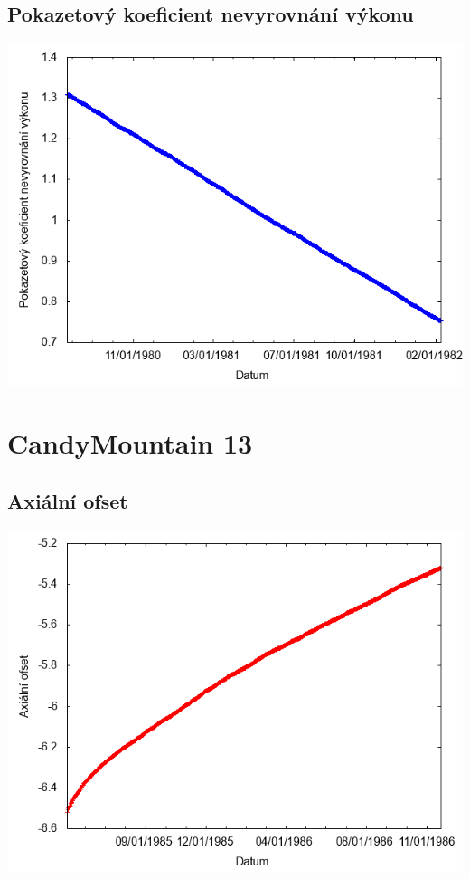 \documentclass[a4paper,twoside,11pt]{article}
\begin{document}
\subsection*{Pokazetový koeficient nevyrovnání výkonu}
\begin{center}
\includegraphics[width=.8\textwidth]{graphs/CandyMountain_12_fha.png}
\end{center}

\newpage
\section*{CandyMountain 13}
\subsection*{Axiální ofset}
\begin{center}
\includegraphics[width=.8\textwidth]{graphs/CandyMountain_13_ao.png}
\end{center}
\end{document}
